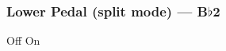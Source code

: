 \subsubsection{Lower Pedal (split mode) --- \UiKey{\SET}B$\flat$2}









































Off
On

